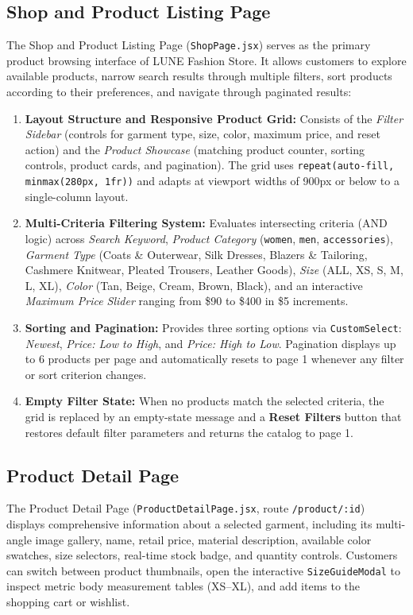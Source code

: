 \documentclass[12pt,a4paper,oneside]{report}
\begin{document}
\subsection{Shop and Product Listing Page}
The Shop and Product Listing Page (\texttt{ShopPage.jsx}) serves as the primary product browsing interface of LUNE Fashion Store. It allows customers to explore available products, narrow search results through multiple filters, sort products according to their preferences, and navigate through paginated results:
\begin{enumerate}[leftmargin=1.2cm]
    \item \textbf{Layout Structure and Responsive Product Grid:}
    Consists of the \textit{Filter Sidebar} (controls for garment type, size, color, maximum price, and reset action) and the \textit{Product Showcase} (matching product counter, sorting controls, product cards, and pagination). The grid uses \texttt{repeat(auto-fill, minmax(280px, 1fr))} and adapts at viewport widths of 900px or below to a single-column layout.
    \item \textbf{Multi-Criteria Filtering System:}
    Evaluates intersecting criteria (AND logic) across \textit{Search Keyword}, \textit{Product Category} (\texttt{women}, \texttt{men}, \texttt{accessories}), \textit{Garment Type} (Coats \& Outerwear, Silk Dresses, Blazers \& Tailoring, Cashmere Knitwear, Pleated Trousers, Leather Goods), \textit{Size} (ALL, XS, S, M, L, XL), \textit{Color} (Tan, Beige, Cream, Brown, Black), and an interactive \textit{Maximum Price Slider} ranging from \$90 to \$400 in \$5 increments.
    \item \textbf{Sorting and Pagination:}
    Provides three sorting options via \texttt{CustomSelect}: \textit{Newest}, \textit{Price: Low to High}, and \textit{Price: High to Low}. Pagination displays up to 6 products per page and automatically resets to page 1 whenever any filter or sort criterion changes.
    \item \textbf{Empty Filter State:}
    When no products match the selected criteria, the grid is replaced by an empty-state message and a \textbf{Reset Filters} button that restores default filter parameters and returns the catalog to page 1.
\end{enumerate}

\subsection{Product Detail Page}
The Product Detail Page (\texttt{ProductDetailPage.jsx}, route \texttt{/product/:id}) displays comprehensive information about a selected garment, including its multi-angle image gallery, name, retail price, material description, available color swatches, size selectors, real-time stock badge, and quantity controls. Customers can switch between product thumbnails, open the interactive \texttt{SizeGuideModal} to inspect metric body measurement tables (XS--XL), and add items to the shopping cart or wishlist.
\end{document}

